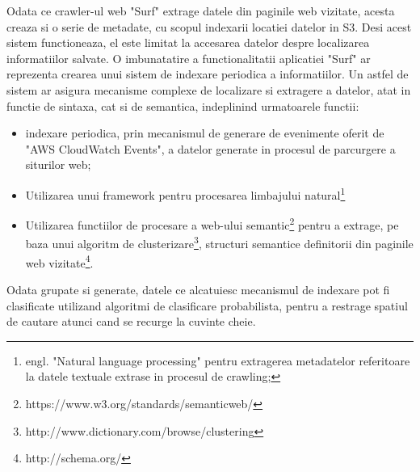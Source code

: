 Odata ce crawler-ul web "Surf" extrage datele din paginile web vizitate, acesta creaza si o serie de metadate, cu scopul indexarii locatiei datelor in S3. Desi acest sistem functioneaza, el este limitat la accesarea datelor despre localizarea informatiilor salvate. O imbunatatire a functionalitatii aplicatiei "Surf" ar reprezenta crearea unui sistem de indexare periodica a informatiilor. Un astfel de sistem ar asigura mecanisme complexe de localizare si extragere a datelor, atat in functie de sintaxa, cat si de semantica, indeplinind urmatoarele functii:

\begin{itemize}
	\item{indexare periodica, prin mecanismul de generare de evenimente oferit de "AWS CloudWatch Events", a datelor generate in procesul de parcurgere a siturilor web;}
	
	\item{Utilizarea unui framework pentru procesarea limbajului natural\footnote{engl. "Natural language processing" pentru extragerea metadatelor referitoare la datele textuale extrase in procesul de crawling;}}
	
	\item{Utilizarea functiilor de procesare a web-ului semantic\footnote{https://www.w3.org/standards/semanticweb/} pentru a extrage, pe baza unui algoritm de clusterizare\footnote{http://www.dictionary.com/browse/clustering}, structuri semantice definitorii din paginile web vizitate\footnote{http://schema.org/}.}	
	
\end{itemize}

Odata grupate si generate, datele ce alcatuiesc mecanismul de indexare pot fi clasificate utilizand algoritmi de clasificare probabilista, pentru a restrage spatiul de cautare atunci cand se recurge la cuvinte cheie.